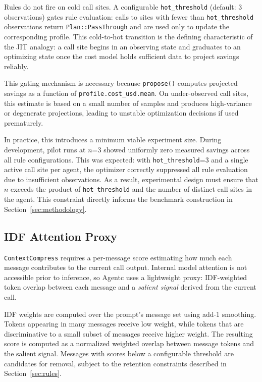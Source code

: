 \documentclass[sigconf,9pt]{acmart}
\begin{document}
Rules do not fire on cold call sites. A configurable \texttt{hot\_threshold} (default:
3 observations) gates rule evaluation: calls to sites with fewer than
\texttt{hot\_threshold} observations return \texttt{Plan::PassThrough} and are used
only to update the corresponding profile. This cold-to-hot transition is the defining
characteristic of the JIT analogy: a call site begins in an observing state and
graduates to an optimizing state once the cost model holds sufficient data to project
savings reliably.

This gating mechanism is necessary because \texttt{propose()} computes projected
savings as a function of \texttt{profile.cost\_usd.mean}. On under-observed call
sites, this estimate is based on a small number of samples and produces high-variance
or degenerate projections, leading to unstable optimization decisions if used
prematurely.

In practice, this introduces a minimum viable experiment size. During development,
pilot runs at $n$=3 showed uniformly zero measured savings across all rule
configurations. This was expected: with \texttt{hot\_threshold}=3 and a single active
call site per agent, the optimizer correctly suppressed all rule evaluation due to
insufficient observations. As a result, experimental design must ensure that $n$
exceeds the product of \texttt{hot\_threshold} and the number of distinct call sites
in the agent. This constraint directly informs the benchmark construction in
Section~\ref{sec:methodology}.

\subsection{IDF Attention Proxy}

\texttt{ContextCompress} requires a per-message score estimating how much each message
contributes to the current call output. Internal model attention is not accessible
prior to inference, so Agentc uses a lightweight proxy: IDF-weighted token overlap
between each message and a \textit{salient signal} derived from the current call.

IDF weights are computed over the prompt's message set using add-1 smoothing. Tokens
appearing in many messages receive low weight, while tokens that are discriminative to
a small subset of messages receive higher weight. The resulting score is computed as a
normalized weighted overlap between message tokens and the salient signal. Messages
with scores below a configurable threshold are candidates for removal, subject to the
retention constraints described in Section~\ref{sec:rules}.
\end{document}

